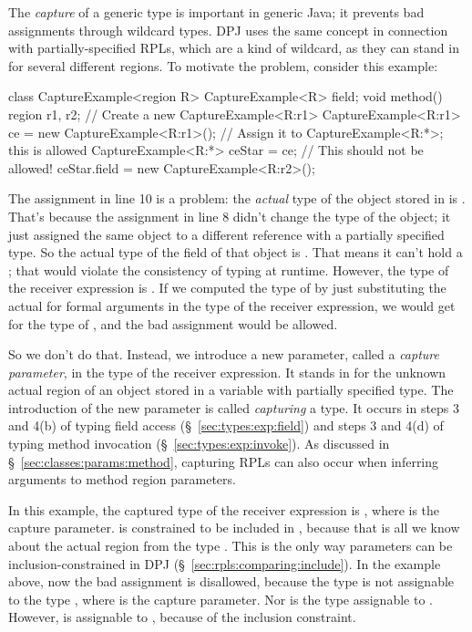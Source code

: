 The \emph{capture} of a generic type is important in generic Java; it
prevents bad assignments through wildcard types.  DPJ uses the same
concept in connection with partially-specified RPLs, which are a kind
of wildcard, as they can stand in for several different regions.  To
motivate the problem, consider this example:
%
\begin{numbereddpjlisting}
class CaptureExample<region R> {
    CaptureExample<R> field;
    void method() {
        region r1, r2;
        // Create a new CaptureExample<R:r1>
        CaptureExample<R:r1> ce = new CaptureExample<R:r1>();
        // Assign it to CaptureExample<R:*>; this is allowed
        CaptureExample<R:*> ceStar = ce;
        // This should not be allowed!
        ceStar.field = new CaptureExample<R:r2>();
    }
}
\end{numbereddpjlisting}
%
The assignment in line 10 is a problem: the \emph{actual} type of the
object stored in  is .  That's
because the assignment in line 8 didn't change the type of the object;
it just assigned the same object to a different reference with a
partially specified type.  So the actual type of the  field
of that object is .  That means it can't
hold a ; that would violate the consistency
of typing at runtime.  However, the type of the receiver expression
 is .  If we computed the type of
 by just substituting the actual for formal
arguments in the type of the receiver expression, we would get
 for the type of , and the
bad assignment would be allowed.

So we don't do that.  Instead, we introduce a new parameter, called a
\emph{capture parameter}, in the type of the receiver expression.  It
stands in for the unknown actual region of an object stored in a
variable with partially specified type.  The introduction of the new
parameter is called \emph{capturing} a type.  It occurs in steps 3 and
4(b) of typing field access (\S~\ref{sec:types:exp:field}) and steps 3
and 4(d) of typing method invocation (\S~\ref{sec:types:exp:invoke}).
As discussed in \S~\ref{sec:classes:params:method}, capturing RPLs can
also occur when inferring arguments to method region parameters.

In this example, the captured type of the receiver expression is
, where  is the capture parameter.
 is constrained to be included in , because that is
all we know about the actual region from the type
.  This is the only way parameters can be
inclusion-constrained in DPJ (\S~\ref{sec:rpls:comparing:include}).
In the example above, now the bad assignment is disallowed, because
the type  is not assignable to the type
, where  is the capture parameter.  Nor
is the type  assignable to
.  However,  is
assignable to , because of the inclusion
constraint.

